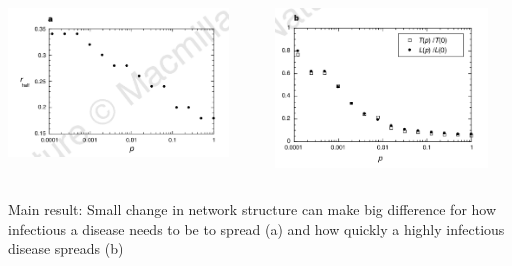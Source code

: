\documentclass[aspectratio=169]{beamer}
\begin{document}
\begin{frame}

\begin{columns}[c]
  \begin{center}
\includegraphics[width = 0.9\textwidth]{figures/watts_collective_1998_fig3a}
  \end{center}
   \begin{center}
\includegraphics[width = 0.9\textwidth]{figures/watts_collective_1998_fig3b}
  \end{center}
\end{columns}

\vfill
Main result: Small change in network structure can make big difference for how infectious a disease needs to be to spread (a) and how quickly a highly infectious disease spreads (b)

\end{frame}
\end{document}
